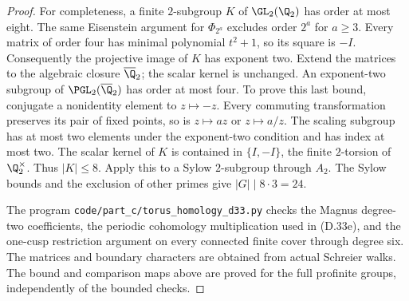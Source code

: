 \begin{proof}
For completeness, a finite $2$-subgroup $K$ of
$\GL_2(\Q_2)$ has order at most eight.  The same
Eisenstein argument for $\Phi_{2^a}$ excludes order
$2^a$ for $a\geq3$.  Every matrix of order four has
minimal polynomial $t^2+1$, so its square is $-I$.
Consequently the projective image of $K$ has exponent
two.  Extend the matrices to the algebraic closure
$\overline{\Q}_2$; the scalar kernel is unchanged.
An exponent-two subgroup of $\PGL_2(\overline{\Q}_2)$
has order at most four.  To prove this
last bound, conjugate a nonidentity element to
$z\mapsto-z$.  Every commuting transformation preserves
its pair of fixed points, so is $z\mapsto az$ or
$z\mapsto a/z$.  The scaling subgroup has at most two
elements under the exponent-two condition and has index
at most two.  The scalar kernel of $K$ is contained in
$\{I,-I\}$, the finite $2$-torsion of $\Q_2^\times$.
Thus $|K|\leq8$.  Apply this to a Sylow $2$-subgroup
through $A_2$.  The Sylow bounds and the exclusion of
other primes give $|G|\mid 8\cdot3=24$.

The program \texttt{code/part\_c/torus\_homology\_d33.py}
checks the Magnus degree-two coefficients, the periodic
cohomology multiplication used in (D.33e), and the
one-cusp restriction argument on every connected finite
cover through degree six.  The matrices and boundary
characters are obtained from actual Schreier walks.
The bound and comparison maps above are proved for the
full profinite groups, independently of the bounded checks.
\end{proof}
